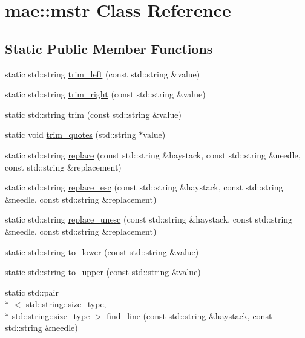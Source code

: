 \hypertarget{classmae_1_1mstr}{\section{mae\-:\-:mstr Class Reference}
\label{classmae_1_1mstr}
}
\subsection*{Static Public Member Functions}
\begin{DoxyCompactItemize}
\item 
static std\-::string \hyperlink{classmae_1_1mstr_a56bbcec6911fdb586e467c0910705e2d}{trim\-\_\-left} (const std\-::string \&value)
\item 
static std\-::string \hyperlink{classmae_1_1mstr_abf762858f021f667c97818eb7fe23837}{trim\-\_\-right} (const std\-::string \&value)
\item 
static std\-::string \hyperlink{classmae_1_1mstr_abb7fe37e72163a15dc8421cc196d53b6}{trim} (const std\-::string \&value)
\item 
static void \hyperlink{classmae_1_1mstr_ab6a08ae2af015c92d84168c85214b9c5}{trim\-\_\-quotes} (std\-::string $\ast$value)
\item 
static std\-::string \hyperlink{classmae_1_1mstr_a194034daef724a50a5e97a7c9a9e0ff6}{replace} (const std\-::string \&haystack, const std\-::string \&needle, const std\-::string \&replacement)
\item 
static std\-::string \hyperlink{classmae_1_1mstr_a0cbe11fc882f95e92bdfeb74dd124de5}{replace\-\_\-esc} (const std\-::string \&haystack, const std\-::string \&needle, const std\-::string \&replacement)
\item 
static std\-::string \hyperlink{classmae_1_1mstr_a44ff1149a740f19fba40d20c15a75c24}{replace\-\_\-unesc} (const std\-::string \&haystack, const std\-::string \&needle, const std\-::string \&replacement)
\item 
static std\-::string \hyperlink{classmae_1_1mstr_a6406c61f815538d381b8c403753780d2}{to\-\_\-lower} (const std\-::string \&value)
\item 
static std\-::string \hyperlink{classmae_1_1mstr_a59d49fd43569aecdbdaf8370439c6527}{to\-\_\-upper} (const std\-::string \&value)
\item 
static std\-::pair\\*
$<$ std\-::string\-::size\-\_\-type, \\*
std\-::string\-::size\-\_\-type $>$ \hyperlink{classmae_1_1mstr_a73b0a7ad10467d7b2ed2ca496ce3b031}{find\-\_\-line} (const std\-::string \&haystack, const std\-::string \&needle)

\end{DoxyCompactItemize}
